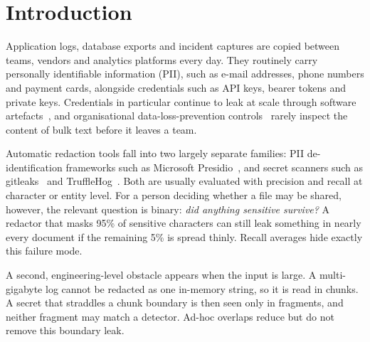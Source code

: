 \documentclass[conference]{IEEEtran}
\begin{document}
\section{Introduction}

Application logs, database exports and incident captures are copied between
teams, vendors and analytics platforms every day. They routinely carry
personally identifiable information (PII), such as e-mail addresses, phone
numbers and payment cards, alongside credentials such as API keys, bearer
tokens and private keys. Credentials in particular continue to leak at scale
through software artefacts~\cite{meli2019git,krause2023pushed}, and
organisational data-loss-prevention controls~\cite{manmadhan2014dlp} rarely
inspect the content of bulk text before it leaves a team.

Automatic redaction tools fall into two largely separate families: PII
de-identification frameworks such as Microsoft Presidio~\cite{presidio}, and
secret scanners such as gitleaks~\cite{gitleaks} and
TruffleHog~\cite{trufflehog}. Both are usually evaluated with precision and
recall at character or entity level. For a person deciding whether a file may
be shared, however, the relevant question is binary: \emph{did anything
sensitive survive?} A redactor that masks 95\% of sensitive characters can
still leak something in nearly every document if the remaining 5\% is spread
thinly. Recall averages hide exactly this failure mode.

A second, engineering-level obstacle appears when the input is large. A
multi-gigabyte log cannot be redacted as one in-memory string, so it is read
in chunks. A secret that straddles a chunk boundary is then seen only in
fragments, and neither fragment may match a detector. Ad-hoc overlaps reduce
but do not remove this boundary leak.
\end{document}
